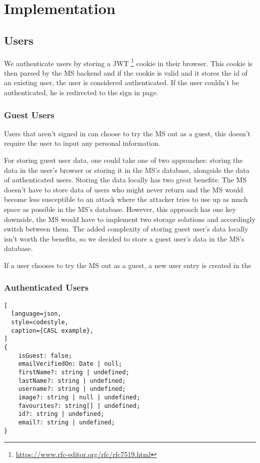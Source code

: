 \chapter{Implementation}
\label{cha:implementation}

\section{Users}

We authenticate users by storing a JWT
\footnote{\url{https://www.rfc-editor.org/rfc/rfc7519.html}} cookie in their browser.
This cookie is then parsed by the MS backend and if the cookie is valid and it stores the
id of an existing user, the user is considered authenticated.
If the user couldn't be authenticated, he is redirected to the sign in page.

\subsection{Guest Users}

Users that aren't signed in can choose to try the MS out as a guest, this doesn't require
the user to input any personal information.

For storing guest user data, one could take one of two approaches:
storing the data in the user's browser or storing it in the MS's database, alongside the
data of authenticated users.
Storing the data locally has two great benefits: 
The MS doesn't have to store data of users who might never return and
the MS would become less susceptible to an attack where the attacker tries to use up as
much space as possible in the MS's database.
However, this approach has one key downside, the MS would have to implement two storage
solutions and accordingly switch between them.
The added complexity of storing guest user's data locally isn't worth the benefits, so we
decided to store a guest user's data in the MS's database.

If a user chooses to try the MS out as a guest, a new user entry is created in the 

\subsection{Authenticated Users}


\begin{lstlisting}[
  language=json,
  style=codestyle,
  caption={CASL example},
]
{
    isGuest: false;
    emailVerifiedOn: Date | null;
    firstName?: string | undefined;
    lastName?: string | undefined;
    username?: string | undefined;
    image?: string | null | undefined;
    favourites?: string[] | undefined;
    id?: string | undefined;
    email?: string | undefined;
}
\end{lstlisting}

